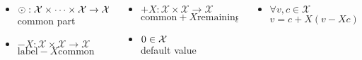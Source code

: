 \documentclass[english]{beamer}
\begin{document}
\begin{frame}
\begin{columns}
    \begin{column}{.35\textwidth}
      \begin{itemize}
        \item $\common{X} : \mathcal{X} \times \dots \times \mathcal{X} \rightarrow \mathcal{X}$ \\
          common part
        \item
          $\minus{X} : \mathcal{X} \times \mathcal{X} \rightarrow \mathcal{X}$ \\
          $\text{label} \minus{X} \text{common}$
      \end{itemize}
    \end{column}
    \begin{column}{.35\textwidth}
      \begin{itemize}
        \item
          $\plus{X} : \mathcal{X} \times \mathcal{X} \rightarrow \mathcal{X}$ \\
          $\text{common} \plus{X} \text{remaining}$
        \item $\zero{X} \in \mathcal{X}$ \\
          default value
      \end{itemize}
    \end{column}
    \begin{column}{.28\textwidth}
      \begin{itemize}
        \item $\forall v, c \in \mathcal{X}$ \\
          $v = c \plus{X} (v \minus{X} c)$
      \end{itemize}
    \end{column}
  \end{columns}
\end{frame}
\end{document}
